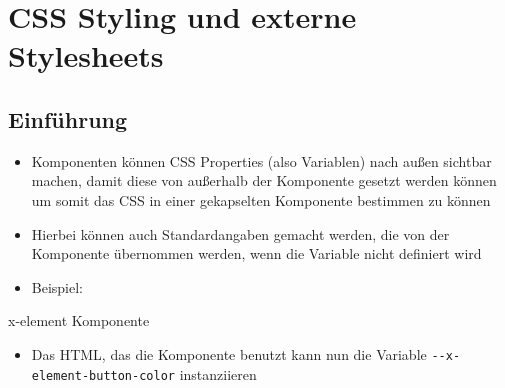 \section{CSS Styling und externe
Stylesheets}\label{css-styling-und-externe-stylesheets}

\subsection{Einführung}\label{einfuxfchrung}

\begin{itemize}
\tightlist
\item
  Komponenten können CSS Properties (also Variablen) nach außen sichtbar
  machen, damit diese von außerhalb der Komponente gesetzt werden können
  um somit das CSS in einer gekapselten Komponente bestimmen zu können
\item
  Hierbei können auch Standardangaben gemacht werden, die von der
  Komponente übernommen werden, wenn die Variable nicht definiert wird
\item
  Beispiel:
\end{itemize}

x-element Komponente

\begin{Shaded}
\begin{Highlighting}[]
\KeywordTok{>}
       \KeywordTok{\{}
         \NormalTok{)}\KeywordTok{;}
      \KeywordTok{\}}
\end{Highlighting}
\end{Shaded}

\begin{itemize}
\tightlist
\item
  Das HTML, das die Komponente benutzt kann nun die Variable
  \texttt{-\/-x-element-button-color} instanziieren
\end{itemize}

\begin{Shaded}
\begin{Highlighting}[]
\KeywordTok{>}
  \KeywordTok{\{}
     \KeywordTok{;}
  \KeywordTok{\}}
\end{Highlighting}
\end{Shaded}

